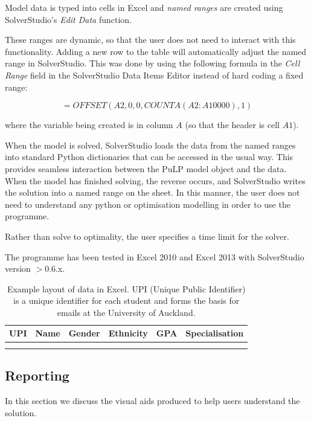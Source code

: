\documentclass[12pt]{ORSNZ}
\begin{document}
Model data is typed into cells in Excel and \emph{named ranges} are created using SolverStudio's \emph{Edit Data} function. 

These ranges are dynamic, so that the user does not need to interact with this functionality. Adding a new row to the table will automatically adjust the named range in SolverStudio. This was done by using the following formula in the \emph{Cell Range} field in the SolverStudio Data Items Editor instead of hard coding a fixed range:

\begin{equation}
	= OFFSET(A2, 0, 0, COUNTA(A2:A10000), 1)
\end{equation}

where the variable being created is in column $A$ (so that the header is cell $A1$).

When the model is solved, SolverStudio loads the data from the named ranges into standard Python dictionaries that can be accessed in the usual way. This provides seamless interaction between the PuLP model object and the data. When the model has finished solving, the reverse occurs, and SolverStudio writes the solution into a named range on the sheet. In this manner, the user does not need to understand any python or optimisation modelling in order to use the programme.

Rather than solve to optimality, the user specifies a time limit for the solver.

The programme has been tested in Excel 2010 and Excel 2013 with SolverStudio version $>$0.6.x.

\begin{table}[!ht]
	\centering
	\begin{tabular}{c | c | c | c | c | c}
	UPI & Name & Gender & Ethnicity & GPA & Specialisation\\
	\hline
	& & & & & \\
	& & & & & 
	\end{tabular}
	\caption{Example layout of data in Excel. UPI (Unique Public Identifier) is a unique identifier for each student and forms the basis for emails at the University of Auckland.}
\end{table}

\subsection{Reporting} \label{reporting}
In this section we discuss the visual aids produced to help users understand the solution.
\end{document}
